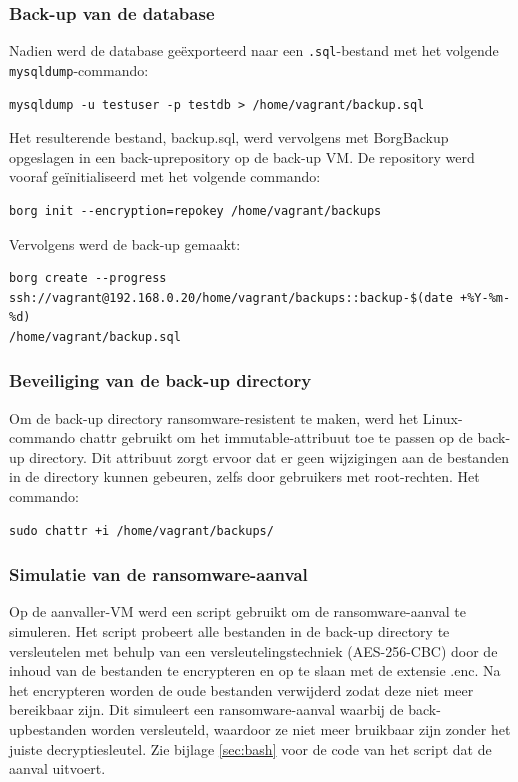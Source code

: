 \subsubsection{Back-up van de database}
Nadien werd de database geëxporteerd naar een \texttt{.sql}-bestand met het volgende \texttt{mysqldump}-commando:
\begin{lstlisting}[language=script, caption={Mysqldump commando om een databank te exporteren.}]
mysqldump -u testuser -p testdb > /home/vagrant/backup.sql
\end{lstlisting}
Het resulterende bestand, backup.sql, werd vervolgens met BorgBackup opgeslagen in een back-uprepository op de back-up VM. De repository werd vooraf geïnitialiseerd met het volgende commando:
\begin{lstlisting}[language=script, caption={Borg commando om een map te initialiseren als Borg repository.}]
borg init --encryption=repokey /home/vagrant/backups
\end{lstlisting}
Vervolgens werd de back-up gemaakt:
\begin{lstlisting}[language=script, caption={Borg commando om een back-up te nemen.}]
borg create --progress 
ssh://vagrant@192.168.0.20/home/vagrant/backups::backup-$(date +%Y-%m-%d) 
/home/vagrant/backup.sql
\end{lstlisting}

\subsubsection{Beveiliging van de back-up directory}
Om de back-up directory ransomware-resistent te maken, werd het Linux-commando chattr gebruikt om het immutable-attribuut toe te passen op de back-up directory. Dit attribuut zorgt ervoor dat er geen wijzigingen aan de bestanden in de directory kunnen gebeuren, zelfs door gebruikers met root-rechten. Het commando:
\begin{lstlisting}[language=script, caption={Linux commando om de map immutable te maken.}]
sudo chattr +i /home/vagrant/backups/
\end{lstlisting}

\subsubsection{Simulatie van de ransomware-aanval}
Op de aanvaller-VM werd een script gebruikt om de ransomware-aanval te simuleren. Het script probeert alle bestanden in de back-up directory te versleutelen met behulp van een versleutelingstechniek (AES-256-CBC) door de inhoud van de bestanden te encrypteren en op te slaan met de extensie .enc. Na het encrypteren worden de oude bestanden verwijderd zodat deze niet meer bereikbaar zijn. Dit simuleert een ransomware-aanval waarbij de back-upbestanden worden versleuteld, waardoor ze niet meer bruikbaar zijn zonder het juiste decryptiesleutel. Zie bijlage \ref{sec:bash} voor de code van het script dat de aanval uitvoert.


